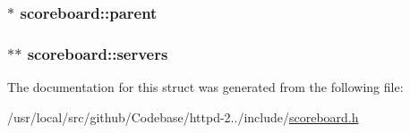 \subsubsection[{\texorpdfstring{parent}{parent}}]{$\ast$ scoreboard\+::parent}\hypertarget{structscoreboard_aa6f6cac3fd4d9881efaf5a2e0b0a98c7}{}\label{structscoreboard_aa6f6cac3fd4d9881efaf5a2e0b0a98c7}
\subsubsection[{\texorpdfstring{servers}{servers}}]{$\ast$$\ast$ scoreboard\+::servers}\hypertarget{structscoreboard_aa37676240ced7c7542111b26d040e4c0}{}\label{structscoreboard_aa37676240ced7c7542111b26d040e4c0}


The documentation for this struct was generated from the following file\+:\begin{DoxyCompactItemize}
\item 
/usr/local/src/github/\+Codebase/httpd-\/2../include/\hyperlink{scoreboard_8h}{scoreboard.\+h}\end{DoxyCompactItemize}
